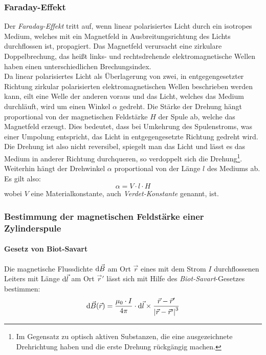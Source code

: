 \subsubsection{Faraday-Effekt}
Der \emph{Faraday-Effekt} tritt auf, wenn linear polarisiertes Licht durch ein isotropes Medium, welches mit ein Magnetfeld in 
Ausbreitungsrichtung des Lichts durchflossen ist, propagiert. Das Magnetfeld verursacht eine zirkulare Doppelbrechung, das heißt links- und 
rechtsdrehende elektromagnetische Wellen haben einen unterschiedlichen Brechungsindex. \\
Da linear polarisiertes Licht als Überlagerung von zwei, in entgegengesetzter Richtung zirkular polarisierten elektromagnetischen Wellen 
beschrieben werden kann, eilt eine Welle der anderen voraus und das Licht, welches das Medium durchläuft, wird um einen Winkel $\alpha$ gedreht. 
Die Stärke der Drehung hängt proportional von der magnetischen Feldstärke $H$ der Spule ab, welche das Magnetfeld erzeugt. 
Dies bedeutet, dass bei Umkehrung des Spulenstroms, was einer Umpolung entspricht, das Licht in entgegengesetzte Richtung gedreht wird. 
Die Drehung ist also nicht reversibel, spiegelt man das Licht und lässt es das Medium in anderer Richtung durchqueren, 
so verdoppelt sich die Drehung\footnote{Im Gegensatz zu optisch aktiven Substanzen, die eine ausgezeichnete Drehrichtung haben 
und die erste Drehung rückgängig machen.}. Weiterhin hängt der Drehwinkel $\alpha$ proportional von der Länge $l$ des Mediums ab.
Es gilt also:
\begin{equation}
\label{eq:faraday}
  \alpha = V \cdot l \cdot H
\end{equation}
wobei $V$ eine Materialkonstante, auch \emph{Verdet-Konstante} genannt, ist.

\subsubsection{Bestimmung der magnetischen Feldstärke einer Zylinderspule}
\paragraph{Gesetz von Biot-Savart}
Die magnetische Flussdichte $\mathrm{d} \vec{B}$ am Ort $\vec{r}$ eines mit dem Strom $I$ durchflossenen Leiters mit Länge $\mathrm{d} \vec{l}$ 
am Ort $\vec{r}'$ lässt sich mit Hilfe des \emph{Biot-Savart}-Gesetzes bestimmen:
\begin{equation}
  \label{eq:biotsavart}
  \mathrm{d} \vec{B}(\vec{r}) = \frac{\mu_0 \cdot I}{4 \pi} \cdot \mathrm{d} \vec{l} \times \frac{\vec{r} - \vec{r}'}{\left|\vec{r} - \vec{r}'\right|^3}
\end{equation}
